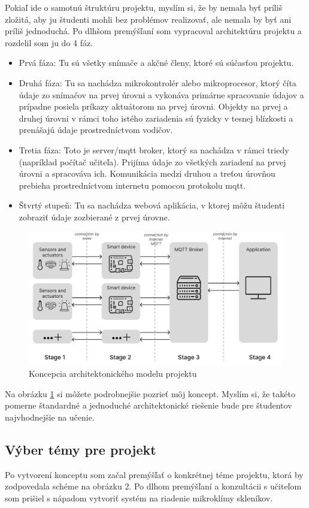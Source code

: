 Pokiaľ ide o samotnú štruktúru projektu, myslím si, že by nemala byť príliš zložitá, aby ju študenti mohli bez problémov realizovať, ale nemala by byť ani príliš jednoduchá. Po dlhšom premýšľaní som vypracoval architektúru projektu a rozdelil som ju do 4 fáz. 
\begin{itemize}
    \item Prvá fáza: Tu sú všetky snímače a akčné členy, ktoré sú súčasťou projektu.
    \item Druhá fáza: Tu sa nachádza mikrokontrolér alebo mikroprocesor, ktorý číta údaje zo snímačov na prvej úrovni a vykonáva primárne spracovanie údajov a prípadne posiela príkazy aktuátorom na prvej úrovni. Objekty na prvej a druhej úrovni v rámci toho istého zariadenia sú fyzicky v tesnej blízkosti a prenášajú údaje prostredníctvom vodičov.
    \item Tretia fáza: Toto je server/\gls{mqtt} broker, ktorý sa nachádza v rámci triedy (napríklad počítač učiteľa). Prijíma údaje zo všetkých zariadení na prvej úrovni a spracováva ich. Komunikácia medzi druhou a treťou úrovňou prebieha prostredníctvom internetu pomocou protokolu \gls{mqtt}. 
    \item Štvrtý stupeň: Tu sa nachádza webová aplikácia, v ktorej môžu študenti zobraziť údaje zozbierané z prvej úrovne.
\end{itemize}
\begin{figure}[!ht]
    \centering
    \includegraphics[width=.9\textwidth]{figures/proekt}
    \caption{Koncepcia architektonického modelu projektu \label{proekt}}
\end{figure}
Na obrázku \ref{proekt} si môžete podrobnejšie pozrieť môj koncept. Myslím si, že takéto pomerne štandardné a jednoduché architektonické riešenie bude pre študentov najvhodnejšie na učenie.


\subsection{Výber témy pre projekt}
Po vytvorení konceptu som začal premýšľať o konkrétnej téme projektu, ktorá by zodpovedala schéme na obrázku 2. Po dlhom premýšľaní a konzultácii s učiteľom som prišiel s nápadom vytvoriť systém na riadenie mikroklímy skleníkov. 

